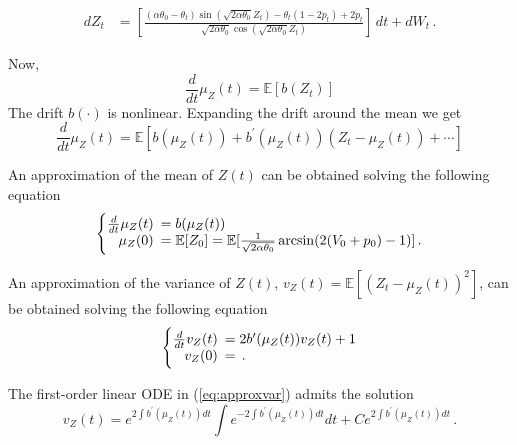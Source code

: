 \documentclass[11pt]{article}
\theoremstyle{definition}
\begin{document}
\begin{align}
dZ_t &  = \left[  \frac{(\alpha \theta_0 - \theta_t) \sin(\sqrt{2 \alpha \theta_0 } Z_t) - \theta_t (1 - 2 p_t) + 2  \dot{p}_t }{\sqrt{2 \alpha \theta_0} \cos{(\sqrt{2 \alpha \theta_0} Z_t)}}  \right] \,dt + dW_t \,. 
\end{align}

Now, 
\begin{equation} \frac{d}{dt} \mu_Z(t) = \mathbb{E} [b(Z_t)] \end{equation}
The drift $b(\cdot)$ is nonlinear. Expanding the drift around the mean we get 
 \begin{equation} \frac{d}{dt} \mu_Z(t) = \mathbb{E} [b( \mu_Z(t)) + b^\prime( \mu_Z(t))  (Z_t - \mu_Z(t) ) + \cdots] \end{equation}

An approximation of the mean of $Z(t)$ can be obtained solving the following equation
\begin{equation}
  \left\{
  \begin{array}{@{}rl@{}}
     \frac{d}{dt} \mu_Z(t) \!\!\!&=  b( \mu_Z(t))  \\
   \mu_Z(0)  \!\!\!&= \mathbb{E} [Z_0] =  \mathbb{E} [ \frac{1}{\sqrt{2 \alpha \theta_0 }} \arcsin (2(V_0 + p_0) -1)]    \,.
 \end{array}\right.  
\end{equation}

An approximation of the variance of $Z(t)$, $v_Z(t) = \mathbb{E} [(Z_t - \mu_Z(t))^2] $, can be obtained solving the following equation
\begin{equation}
  \left\{
  \begin{array}{@{}rl@{}}
     \frac{d}{dt} v_Z(t) \!\!\!&=  2 b^\prime( \mu_Z(t)) v_Z(t) + 1  \\
   v_Z(0)  \!\!\!&=     \,.
 \end{array}\right.   \label{eq:approxvar}
\end{equation} 

The first-order linear ODE in (\ref{eq:approxvar}) admits the solution
\begin{equation}
v_Z(t) = e^{2 \int b^\prime( \mu_Z(t)) dt}  \int   e^{- 2 \int b^\prime( \mu_Z(t)) dt} dt + C e^{2 \int b^\prime( \mu_Z(t)) dt} \,.
\end{equation}
\end{document}

